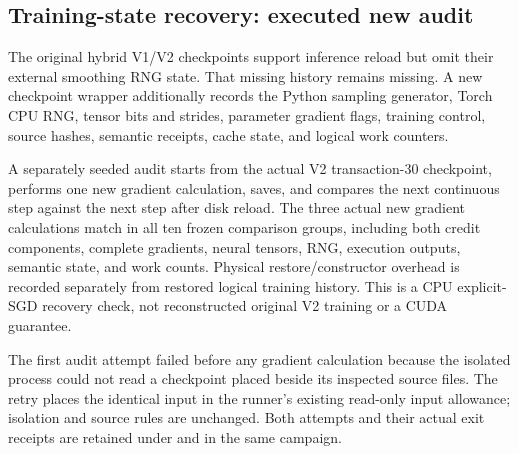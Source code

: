 \subsection{Training-state recovery: executed new audit}

The original hybrid V1/V2 checkpoints support inference reload but omit their
external smoothing RNG state. That missing history remains missing. A new
checkpoint wrapper additionally records the Python sampling generator, Torch
CPU RNG, tensor bits and strides, parameter gradient flags, training control,
source hashes, semantic receipts, cache state, and logical work counters.

A separately seeded audit starts from the actual V2 transaction-30 checkpoint,
performs one new gradient calculation, saves, and compares the next continuous
step against the next step after disk reload. The three actual new gradient
calculations match in all ten frozen comparison groups, including both credit
components, complete gradients, neural tensors, RNG, execution outputs, semantic
state, and work counts. Physical restore/constructor overhead is recorded
separately from restored logical training history. This is a CPU explicit-SGD
recovery check, not reconstructed original V2 training or a CUDA guarantee.

The first audit attempt failed before any gradient calculation because the
isolated process could not read a checkpoint placed beside its inspected source
files. The retry places the identical input in the runner's existing read-only
input allowance; isolation and source rules are unchanged. Both attempts and
their actual exit receipts are retained under
and  in the same campaign.
